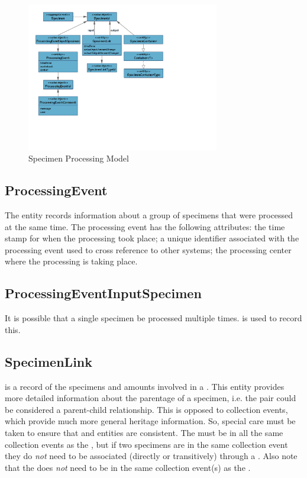 \begin{figure}[H]
  \centering
  \includegraphics[trim={10mm 48mm 78mm 10mm}, clip,
    width=0.75\textwidth]{images/specimen-processing}
  \caption{Specimen Processing Model}
  \label{fig:specimen-processing}
\end{figure}

\subsection*{ProcessingEvent}
The  entity records information about a group of
specimens that were processed at the same time. The processing event has the
following attributes:  the time stamp for when the
processing took place;  a unique identifier associated with
the processing event used to cross reference to other systems;
 the processing center where the processing is taking place.

\subsection*{ProcessingEventInputSpecimen}
It is possible that a single specimen be processed multiple
times.  is used to record this.

\subsection*{SpecimenLink}
 is a record of the specimens and amounts involved
in a . This entity provides more detailed
information about the parentage of a specimen, i.e. the 
pair could be considered a parent-child relationship. This is opposed to
collection events, which provide much more general heritage information. So,
special care must be taken to ensure that 
and  entities are consistent. The 
must be in all the same collection events as the , but if two
specimens are in the same collection event they do \emph{not} need to be
associated (directly or transitively) through a . Also
note that the  does \emph{not} need to be in the same
collection event(s) as the .

